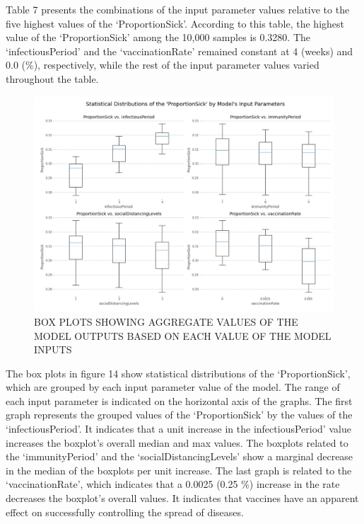 \documentclass[smallextended]{svjour3}       %
\begin{document}
Table 7 presents the combinations of the input parameter values relative to the five highest values of the ‘ProportionSick’. According to this table, the highest value of the ‘ProportionSick’ among the 10,000 samples is 0.3280. The ‘infectiousPeriod’ and the ‘vaccinationRate’ remained constant at 4 (weeks) and 0.0 (\%), respectively, while the rest of the input parameter values varied throughout the table.




\begin{figure}
	\centering
	\includegraphics[width=0.7\linewidth]{figures/boxplots.png}
	\caption{BOX PLOTS SHOWING AGGREGATE VALUES OF THE MODEL OUTPUTS BASED ON EACH VALUE OF THE MODEL INPUTS\label{fig:boxplots}}
\end{figure}


The box plots in figure 14 show statistical distributions of the ‘ProportionSick’, which are grouped by each input parameter value of the model. The range of each input parameter is indicated on the horizontal axis of the graphs.
The first graph represents the grouped values of the ‘ProportionSick’ by the values of the ‘infectiousPeriod’. It indicates that a unit increase in the infectiousPeriod’ value increases the boxplot’s overall median and max values.
The boxplots related to the ‘immunityPeriod’ and the ‘socialDistancingLevels’ show a marginal decrease in the median of the boxplots per unit increase.
The last graph is related to the ‘vaccinationRate’, which indicates that a 0.0025 (0.25 \%) increase in the rate decreases the boxplot’s overall values. It indicates that vaccines have an apparent effect on successfully controlling the spread of diseases.
\end{document}
